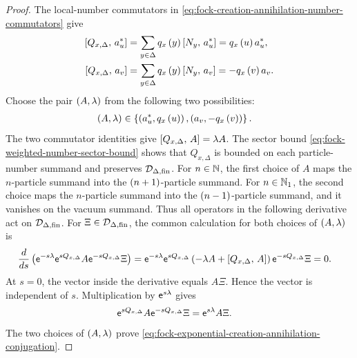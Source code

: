 \documentclass[11pt,a4paper]{article}
\theoremstyle{plain}
\theoremstyle{definition}
\theoremstyle{remark}
\begin{document}
\begin{proof}
The local-number commutators in
\eqref{eq:fock-creation-annihilation-number-commutators} give
$$\begin{aligned}
\left[ Q_{x,\Delta},\,a_u^{\ast} \right]
& =
\sum_{y\in\Delta}
q_x \left( y \right)\left[ N_y,\,a_u^{\ast} \right]
=
q_x \left( u \right)a_u^{\ast},
\\
\left[ Q_{x,\Delta},\,a_v \right]
& =
\sum_{y\in\Delta}
q_x \left( y \right)\left[ N_y,\,a_v \right]
=
-q_x \left( v \right)a_v.
\end{aligned}$$
Choose the pair $\left( A,\lambda \right)$ from the following two possibilities:
$$\begin{aligned}
\left( A,\lambda \right)
& \in
\left\{ 
\left( a_u^{\ast},q_x \left( u \right) \right),
\left( a_v,-q_x \left( v \right) \right) \right\}.
\end{aligned}$$
The two commutator identities give $\left[ Q_{x,\Delta},\,A \right]=\lambda A$.
The sector bound \eqref{eq:fock-weighted-number-sector-bound} shows that
$Q_{x,\Delta}$ is bounded on each particle-number summand and preserves
$\sphilb{D}_{\Delta,\txtfin}$.
For $n\in\mathbb{N}$, the first choice of $A$ maps the $n$-particle summand into the
$\left( n+1 \right)$-particle summand.
For $n\in\mathbb{N}_1$, the second choice maps the $n$-particle summand into the
$\left( n-1 \right)$-particle summand, and it vanishes on the vacuum summand.
Thus all operators in the following derivative act on $\sphilb{D}_{\Delta,\txtfin}$.
For $\Xi\in\sphilb{D}_{\Delta,\txtfin}$, the common calculation for both choices of
$\left( A,\lambda \right)$ is
$$\begin{aligned}
\frac{d}{d s}
\left( 
\mathsf{e}^{-s\lambda}
\mathsf{e}^{sQ_{x,\Delta}}
A
\mathsf{e}^{-sQ_{x,\Delta}}\Xi \right)
& =
\mathsf{e}^{-s\lambda}
\mathsf{e}^{sQ_{x,\Delta}}
\left( 
-\lambda A+\left[ Q_{x,\Delta},\,A \right] \right)
\mathsf{e}^{-sQ_{x,\Delta}}\Xi
=
0.
\end{aligned}$$
At $s=0$, the vector inside the derivative equals $A\Xi$.
Hence the vector is independent of $s$.
Multiplication by $\mathsf{e}^{s\lambda}$ gives
$$\begin{aligned}
\mathsf{e}^{sQ_{x,\Delta}}
A
\mathsf{e}^{-sQ_{x,\Delta}}\Xi
& =
\mathsf{e}^{s\lambda}A\Xi.
\end{aligned}$$
The two choices of $\left( A,\lambda \right)$ prove
\eqref{eq:fock-exponential-creation-annihilation-conjugation}.
\end{proof}
\end{document}
